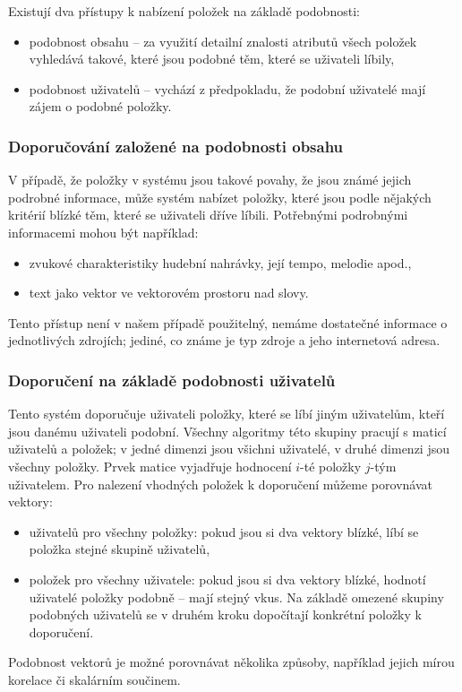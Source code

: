 Existují dva přístupy k nabízení položek na základě podobnosti:
\begin{itemize}
	\item podobnost obsahu -- za využití detailní znalosti atributů všech položek vyhledává takové, které jsou podobné těm, které se uživateli líbily,
	\item podobnost uživatelů -- vychází z předpokladu, že podobní uživatelé mají zájem o podobné položky.
\end{itemize}

\subsubsection{Doporučování založené na podobnosti obsahu}

V případě, že položky v systému jsou takové povahy, že jsou známé jejich podrobné informace, může systém nabízet položky, které jsou podle nějakých kritérií blízké těm, které se uživateli dříve líbili.
Potřebnými podrobnými informacemi mohou být například:
\begin{itemize}
	\item zvukové charakteristiky hudební nahrávky, její tempo, melodie apod.,
	\item text jako vektor ve vektorovém prostoru nad slovy.
\end{itemize}

Tento přístup není v našem případě použitelný, nemáme dostatečné informace o jednotlivých zdrojích; jediné, co známe je typ zdroje a jeho internetová adresa.

\subsubsection{Doporučení na základě podobnosti uživatelů}

Tento systém doporučuje uživateli položky, které se líbí jiným uživatelům, kteří jsou danému uživateli podobní.
Všechny algoritmy této skupiny pracují s maticí uživatelů a položek; v jedné dimenzi jsou všichni uživatelé, v druhé dimenzi jsou všechny položky.
Prvek matice vyjadřuje hodnocení $i$-té položky $j$-tým uživatelem.
Pro nalezení vhodných položek k doporučení můžeme porovnávat vektory:
\begin{itemize}
	\item uživatelů pro všechny položky: pokud jsou si dva vektory blízké, líbí se položka stejné skupině uživatelů,
	\item položek pro všechny uživatele: pokud jsou si dva vektory blízké, hodnotí uživatelé položky podobně -- mají stejný vkus.
		Na základě omezené skupiny podobných uživatelů se v druhém kroku dopočítají konkrétní položky k doporučení.
\end{itemize}
Podobnost vektorů je možné porovnávat několika způsoby, například jejich mírou korelace či skalárním součinem.

